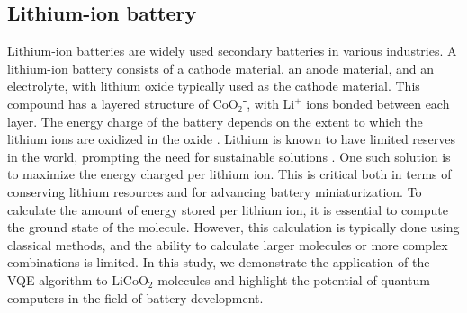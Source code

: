 \documentclass[pdflatex,sn-mathphys-num]{sn-jnl}%
\theoremstyle{thmstyleone}%
\theoremstyle{thmstyletwo}%
\theoremstyle{thmstylethree}%
\begin{document}
\subsection{Lithium-ion battery}\label{subsec2.1}
Lithium-ion batteries are widely used secondary batteries in various industries. A lithium-ion battery consists of a cathode material, an anode material, and an electrolyte, with lithium oxide typically used as the cathode material. This compound has a layered structure of CoO₂⁻, with \(\mathrm{Li^+}\) ions bonded between each layer. The energy charge of the battery depends on the extent to which the lithium ions are oxidized in the oxide \cite{LI4,LI5}.
Lithium is known to have limited reserves in the world, prompting the need for sustainable solutions \cite{LI1}. One such solution is to maximize the energy charged per lithium ion. 
This is critical both in terms of conserving lithium resources and for advancing battery miniaturization\cite{LI2,LI3}. 
To calculate the amount of energy stored per lithium ion, it is essential to compute the ground state of the molecule. However, this calculation is typically done using classical methods, 
and the ability to calculate larger molecules or more complex combinations is limited.
In this study, we demonstrate the application of the VQE algorithm to \(\mathrm{LiCoO_2}\) molecules and highlight the potential of quantum computers in the field of battery development.
\end{document}
